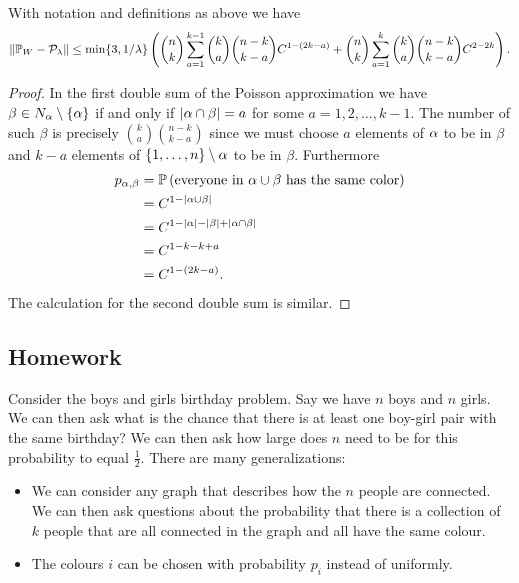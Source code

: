 \begin{prop}
    With notation and definitions as above we have 
    \[\left\|{\mathbb{P}}_W - {\mathcal{P}}_\lambda\right\| \le \min\{3, 1/\lambda\} \left(\binom{n}{k}\sum_{a=1}^{k-1} \binom{k}{a}\binom{n-k}{k-a} C^{1-(2k-a)}+\binom{n}{k}\sum_{a=1}^{k}\binom{k}{a}\binom{n-k}{k-a} C^{2-2k}\right). \]
\end{prop}
\begin{proof}
    In the first double sum of the Poisson approximation we have $\beta \in N_{\alpha} \setminus \{{\alpha}\}$ if and only if ${\left\lvert{\alpha} \cap \beta\right\rvert}=a$ for some $a = 1,2,\ldots,k-1$. The number of such $\beta$ is precisely $\binom{k}{a}\binom{n-k}{k-a}$ since we must choose $a$ elements of ${\alpha}$ to be in $\beta$ and $k-a$ elements of $\{1,\ldots,n\} \setminus {\alpha}$ to be in $\beta$. Furthermore
    \begin{align*}
        p_{{\alpha},\beta}&= {\mathbb{P}}\left(\text{everyone in } {\alpha} \cup \beta \text{ has the same color}\right)\\
        &=C^{1-{\left\lvert{\alpha} \cup \beta\right\rvert}}\\
        &=C^{1-{\left\lvert{\alpha}\right\rvert}-{\left\lvert\beta\right\rvert}+{\left\lvert{\alpha} \cap \beta\right\rvert}}\\
        &=C^{1-k-k+a}\\
        &=C^{1-(2k-a)}.
    \end{align*}
    The calculation for the second double sum is similar.
\end{proof}
\subsection{Homework}
Consider the boys and girls birthday problem. Say we have $n$ boys and $n$ girls. We can then ask what is the chance that there is at least one boy-girl pair with the same birthday? We can then ask how large does $n$ need to be for this probability to equal $\frac{1}{2}$. There are many generalizations:
\begin{itemize}
    \item We can consider any graph that describes how the $n$ people are connected. We can then ask questions about the probability that there is a collection of $k$ people that are all connected in the graph and all have the same colour.
    \item The colours $i$ can be chosen with probability $p_i$ instead of uniformly. 
\end{itemize}
